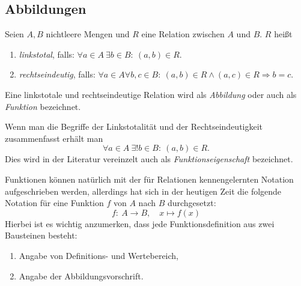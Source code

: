 \subsection{Abbildungen}

\begin{frame}
\begin{mydef}
Seien $A,B$ nichtleere Mengen und $R$ eine Relation zwischen $A$ und $B$.
$R$ heißt

\begin{enumerate}
\item \textit{linkstotal}, falls:
$\forall a \in A \ \exists b \in B\!:\ (a,b) \in R$.

\item \textit{rechtseindeutig}, falls:
$\forall a \in A \forall b,c \in B\!:\ (a,b) \in R \wedge (a,c) \in R
\Rightarrow b = c $.
\end{enumerate}

Eine linkstotale und rechtseindeutige Relation wird als \textit{Abbildung} oder
auch als \textit{Funktion} bezeichnet.
\end{mydef}


\begin{remark}
Wenn man die Begriffe der Linkstotalität und der Rechtseindeutigkeit
zusammenfasst erhält man
\[
  \forall a \in A \  \exists ! b \in B\!:\ (a,b) \in R.
\]
Dies wird in der Literatur vereinzelt auch als \textit{Funktionseigenschaft}
bezeichnet.
\end{remark}
\end{frame}


\begin{frame}
\begin{remark}
Funktionen können natürlich mit der für Relationen kennengelernten Notation
aufgeschrieben werden, allerdings hat sich in der heutigen Zeit die folgende
Notation für eine Funktion $f$ von $A$ nach $B$ durchgesetzt:
\[
  f\!:\ A \to B, \quad x \mapsto f(x)
\]
Hierbei ist es wichtig anzumerken, dass jede Funktionsdefinition aus zwei
Bausteinen besteht:

\begin{enumerate}
\item Angabe von Definitions- und Wertebereich,
\item Angabe der Abbildungsvorschrift.
\end{enumerate}
\end{remark}
\end{frame}


